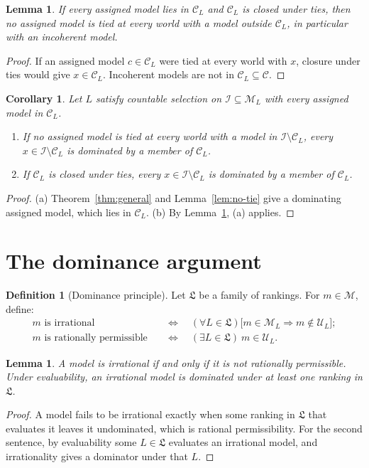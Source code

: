 \documentclass[11pt]{article}
\newtheorem{lemma}[theorem]{Lemma}
\newtheorem{corollary}[theorem]{Corollary}
\theoremstyle{definition}
\newtheorem{definition}[theorem]{Definition}
\theoremstyle{remark}
\newcommand{\M}{\mathcal M}
\newcommand{\C}{\mathcal C}
\newcommand{\I}{\mathcal I}
\newcommand{\U}{\mathcal U}
\newcommand{\Lf}{\mathfrak L}
\begin{document}
\begin{lemma}\label{lem:tie-sufficient}
If every assigned model lies in $\C_L$ and $\C_L$ is closed under ties, then no assigned model is tied at every world with a model outside $\C_L$, in particular with an incoherent model.
\end{lemma}
\begin{proof}
If an assigned model $c\in\C_L$ were tied at every world with $x$, closure under ties would give $x\in\C_L$. Incoherent models are not in $\C_L\subseteq\C$.
\end{proof}

\begin{corollary}\label{cor:coherent-assigned}
Let $L$ satisfy countable selection on $\I\subseteq\M_L$ with every assigned model in $\C_L$.
\begin{enumerate}[label=(\alph*)]
\item If no assigned model is tied at every world with a model in $\I\setminus\C_L$, every $x\in\I\setminus\C_L$ is dominated by a member of $\C_L$.
\item If $\C_L$ is closed under ties, every $x\in\I\setminus\C_L$ is dominated by a member of $\C_L$.
\end{enumerate}
\end{corollary}
\begin{proof}
(a) Theorem~\ref{thm:general} and Lemma~\ref{lem:no-tie} give a dominating assigned model, which lies in $\C_L$. (b) By Lemma~\ref{lem:tie-sufficient}, (a) applies.
\end{proof}
\endgroup

\section{The dominance argument}\label{sec:conclusion}

\begin{definition}[Dominance principle]\label{def:permissibility}
Let $\Lf$ be a family of rankings. For $m\in\M$, define:
\begin{align*}
m\text{ is irrational}&\quad\Longleftrightarrow\quad (\forall L\in\Lf)\bigl[m\in\M_L\Rightarrow m\notin\U_L\bigr];\\
m\text{ is rationally permissible}&\quad\Longleftrightarrow\quad (\exists L\in\Lf)\ m\in\U_L.
\end{align*}
\end{definition}

\begin{lemma}\label{lem:complement}
A model is irrational if and only if it is not rationally permissible. Under evaluability, an irrational model is dominated under at least one ranking in $\Lf$.
\end{lemma}
\begin{proof}
A model fails to be irrational exactly when some ranking in $\Lf$ that evaluates it leaves it undominated, which is rational permissibility. For the second sentence, by evaluability some $L\in\Lf$ evaluates an irrational model, and irrationality gives a dominator under that $L$.
\end{proof}
\end{document}
